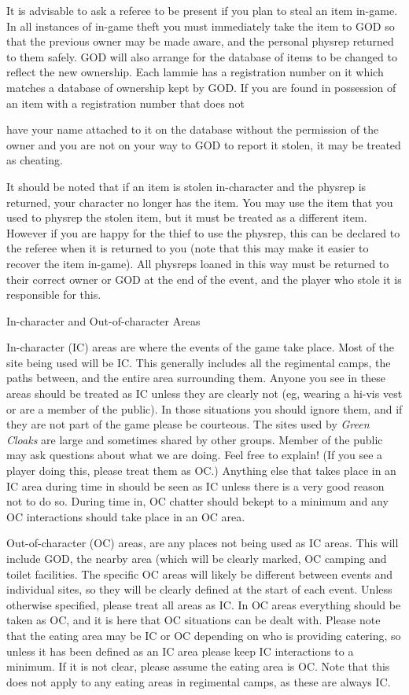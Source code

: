It is advisable to ask a referee to be present if you plan to steal an item in-game. In all instances of in-game theft you must immediately take the item to GOD so that the previous owner may be made aware, and the personal physrep returned to them safely. GOD will also arrange for the database of items to be changed to reflect the new ownership. Each lammie has a registration number on it which matches a database of ownership kept by GOD. If you are found in possession of an item with a registration number that does not

have your name attached to it on the database without the permission of the owner and you are not on your way to GOD to report it stolen, it may be treated as cheating.

It should be noted that if an item is stolen in-character and the physrep is returned, your character no longer has the item. You may use the item that you used to physrep the stolen item, but it must be treated as a different item. However if you are happy for the thief to use the physrep, this can be declared to the referee when it is returned to you (note that this may make it easier to recover the item in-game). All physreps loaned in this way must be returned to their correct owner or GOD at the end of the event, and the player who stole it is responsible for this.

In-character and Out-of-character Areas

In-character (IC) areas are where the events of the game take place. Most of the site being used will be IC. This generally includes all the regimental camps, the paths between, and the entire area surrounding them. Anyone you see in these areas should be treated as IC unless they are clearly not (eg, wearing a hi-vis vest or are a member of the public). In those situations you should ignore them, and if they are not part of the game please be courteous. The sites used by \textit{Green Cloaks} are large and sometimes shared by other groups. Member of the public may ask questions about what we are doing. Feel free to explain! (If you see a player doing this, please treat them as OC.) Anything else that takes place in an IC area during time in should be seen as IC unless there is a very good reason not to do so. During time in, OC chatter should bekept to a minimum and any OC interactions should take place in an OC area.

Out-of-character (OC) areas, are any places not being used as IC areas. This will include GOD, the nearby area (which will be clearly marked, OC camping and toilet facilities. The specific OC areas will likely be different between events and individual sites, so they will be clearly defined at the start of each event. Unless otherwise specified, please treat all areas as IC. In OC areas everything should be taken as OC, and it is here that OC situations can be dealt with. Please note that the eating area may be IC or OC depending on who is providing catering, so unless it has been defined as an IC area please keep IC interactions to a minimum. If it is not clear, please assume the eating area is OC. Note that this does not apply to any eating areas in regimental camps, as these are always IC.

